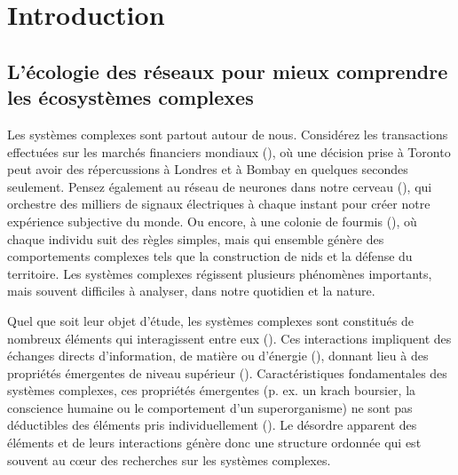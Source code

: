 
\francais   
\doublespacing
\chapter*{Introduction}



\section{L'écologie des réseaux pour mieux comprendre les écosystèmes complexes}

Les systèmes complexes sont partout autour de nous. Considérez les transactions
effectuées sur les marchés financiers mondiaux (\cite{Anderson2018Economy}), où
une décision prise à Toronto peut avoir des répercussions à Londres et à Bombay
en quelques secondes seulement. Pensez également au réseau de neurones dans
notre cerveau (\cite{Sporns2011Human}), qui orchestre des milliers de signaux
électriques à chaque instant pour créer notre expérience subjective du monde. Ou
encore, à une colonie de fourmis (\cite{Bonabeau1999Swarm}), où chaque individu
suit des règles simples, mais qui ensemble génère des comportements complexes
tels que la construction de nids et la défense du territoire. Les systèmes
complexes régissent plusieurs phénomènes importants, mais souvent difficiles à
analyser, dans notre quotidien et la nature. 

Quel que soit leur objet d'étude, les systèmes complexes sont constitués de
nombreux éléments qui interagissent entre eux (\cite{Rind1999Complexity}). Ces
interactions impliquent des échanges directs d'information, de matière ou
d'énergie (\cite{Ladyman2013What}), donnant lieu à des propriétés émergentes de
niveau supérieur (\cite{Foote2007Mathematics}). Caractéristiques fondamentales
des systèmes complexes, ces propriétés émergentes (p. ex. un krach boursier, la
conscience humaine ou le comportement d'un superorganisme) ne sont pas
déductibles des éléments pris individuellement (\cite{Nielsen2000Emergent}). Le
désordre apparent des éléments et de leurs interactions génère donc une
structure ordonnée qui est souvent au cœur des recherches sur les systèmes
complexes. 

